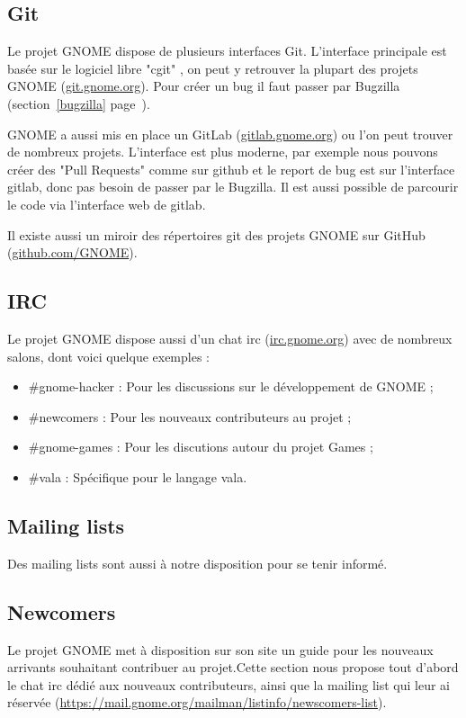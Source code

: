 \documentclass[12pt]{report}
\begin{document}
\subsection{Git}
\label{git}

\label{cgit}
Le projet GNOME dispose de plusieurs interfaces Git. L'interface 
principale est basée sur le logiciel libre "cgit"
, on peut y retrouver la plupart des projets GNOME 
(\href{https://git.gnome.org/}{git.gnome.org}). Pour créer un bug il faut
passer par Bugzilla (section~\ref{bugzilla} page~\pageref{bugzilla}).

\label{gitlab}
GNOME a aussi mis en place un GitLab (\href{https://gitlab.gnome.org/GNOME}
{gitlab.gnome.org}) ou l'on peut trouver de nombreux projets. L'interface
est plus moderne, par exemple nous pouvons créer des "Pull Requests" comme
sur github et le report de bug est sur l'interface gitlab, donc pas besoin
de passer par le Bugzilla. Il est aussi possible de parcourir le code via
l'interface web de gitlab.

\label{github}
Il existe aussi un miroir des répertoires git des projets GNOME sur GitHub 
(\href{https://github.com/GNOME}{github.com/GNOME}).

\subsection{IRC}
Le projet GNOME dispose aussi d'un chat irc (\url{irc.gnome.org})
avec de nombreux salons, dont voici quelque exemples :
\begin{itemize}
\item \#gnome-hacker : Pour les discussions sur le développement de GNOME ;
\item \#newcomers : Pour les nouveaux contributeurs au projet ;
\item \#gnome-games : Pour les discutions autour du projet Games ;
\item \#vala : Spécifique pour le langage vala.
\end{itemize}

\subsection{Mailing lists}
Des mailing lists sont aussi à notre disposition pour se tenir informé.

\subsection{Newcomers}
Le projet GNOME met à disposition sur son site un guide pour les nouveaux
arrivants souhaitant contribuer au projet.Cette section nous propose
tout d'abord le chat irc dédié aux nouveaux contributeurs, ainsi que la
mailing list qui leur ai réservée
(\url{https://mail.gnome.org/mailman/listinfo/newscomers-list}).
\end{document}
